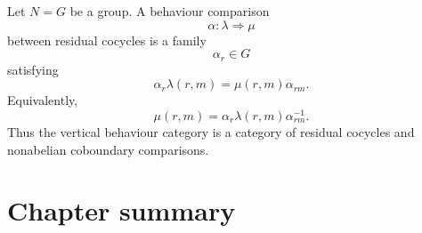 \begin{example}
\label{ex:group-valued-coboundary-outputs}
    Let \(N=G\) be a group. A behaviour comparison
    \[
        \alpha:\lambda\Rightarrow\mu
    \]
    between residual cocycles is a family
    \[
        \alpha_r\in G
    \]
    satisfying
    \[
        \alpha_r\lambda(r,m)=\mu(r,m)\alpha_{rm}.
    \]
    Equivalently,
    \[
        \mu(r,m)=\alpha_r\lambda(r,m)\alpha_{rm}^{-1}.
    \]
    Thus the vertical behaviour category is a category of residual cocycles and nonabelian coboundary comparisons.
\end{example}

\section{Chapter summary}
\label{sec:behaviour-myhill-nerode-summary}

